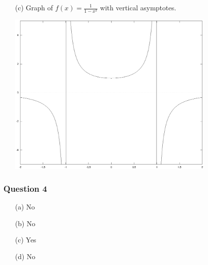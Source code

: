 \documentclass[11pt,a4paper]{article}
\begin{document}
\begin{enumerate}
	\item[(c)] Graph of $f(x)=\frac{1}{1-x^2}$ with vertical asymptotes.
	\begin{center}
		\includegraphics[width=0.8\textwidth]{plot3c.eps}
	\end{center}
	
\end{enumerate}

\subsubsection*{Question 4} 
\begin{enumerate}
	\item[(a)] No
	\item[(b)] No
	\item[(c)] Yes
	\item[(d)] No
\end{enumerate}

\pagebreak
\end{document}
